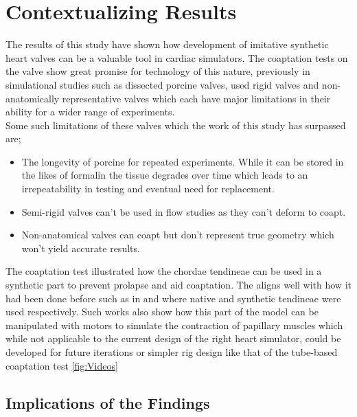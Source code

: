 \section{Contextualizing Results}


The results of this study have shown how development of imitative synthetic heart valves can be a valuable tool in cardiac simulators. The coaptation tests on the valve show great promise for technology of this nature, previously in simulational studies such as  dissected porcine valves,  used rigid valves and  non-anatomically representative valves which each have major limitations in their ability for a wider range of experiments.\\
Some such limitations of these valves which the work of this study has surpassed are;
\begin{itemize}
    \item The longevity of porcine for repeated experiments. While it can be stored in the likes of formalin the tissue degrades over time which leads to an irrepeatability in testing and eventual need for replacement.
    \item Semi-rigid valves can't be used in flow studies as they can't deform to coapt.
    \item Non-anatomical valves can coapt but don't represent true geometry which won't yield accurate results.
\end{itemize}

\mynewline
The coaptation test illustrated how the chordae tendineae can be used in a synthetic part to prevent prolapse and aid coaptation. The aligns well with how it had been done before such as in  and  where native and synthetic tendineae were used respectively. Such works also show how this part of the model can be manipulated with motors to simulate the contraction of papillary muscles which while not applicable to the current design of the right heart simulator, could be developed for future iterations or simpler rig design like that of the tube-based coaptation test \cref{fig:Videos}

\subsection{Implications of the Findings}



